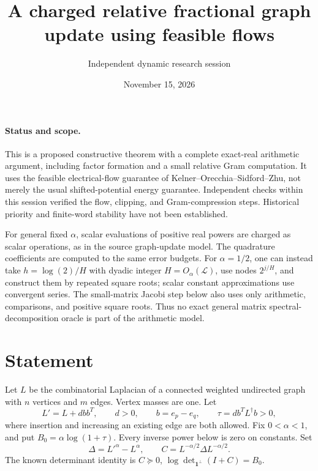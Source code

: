 \documentclass[11pt]{article}
\title{A charged relative fractional graph update using feasible flows}
\author{Independent dynamic research session}
\date{November 15, 2026}
\begin{document}
\maketitle

\paragraph{Status and scope.}
This is a proposed constructive theorem with a complete exact-real
arithmetic argument, including factor formation and a small relative
Gram computation. It uses the feasible electrical-flow guarantee of
Kelner--Orecchia--Sidford--Zhu, not merely the usual shifted-potential
energy guarantee. Independent checks within this session verified the
flow, clipping, and Gram-compression steps. Historical priority and
finite-word stability have not been established.

For general fixed $\alpha$, scalar evaluations of positive real powers
are charged as scalar operations, as in the source graph-update model.
The quadrature coefficients are computed to the same error budgets.
For $\alpha=1/2$, one can instead take $h=\log(2)/H$ with dyadic integer
$H=O_\alpha(\mathcal L)$, use nodes $2^{j/H}$, and construct them by
repeated square roots; scalar constant approximations use convergent
series. The small-matrix Jacobi step below also uses only arithmetic,
comparisons, and positive square roots. Thus no exact general matrix
spectral-decomposition oracle is part of the arithmetic model.

\section{Statement}
Let $L$ be the combinatorial Laplacian of a connected weighted undirected
graph with $n$ vertices and $m$ edges. Vertex masses are one. Let
\[
 L'=L+d b b^T,\qquad d>0,\qquad b=e_p-e_q,\qquad
 \tau=d b^TL^\dagger b>0,
\]
where insertion and increasing an existing edge are both allowed.
Fix $0<\alpha<1$, and put $B_0=\alpha\log(1+\tau)$.
Every inverse power below is zero on constants. Set
\[
 \Delta=L'^\alpha-L^\alpha,\qquad
 C=L^{-\alpha/2}\Delta L^{-\alpha/2}.
\]
The known determinant identity is
$C\succeq0$, $\log\det_{\mathbf1^\perp}(I+C)=B_0$.
\end{document}
